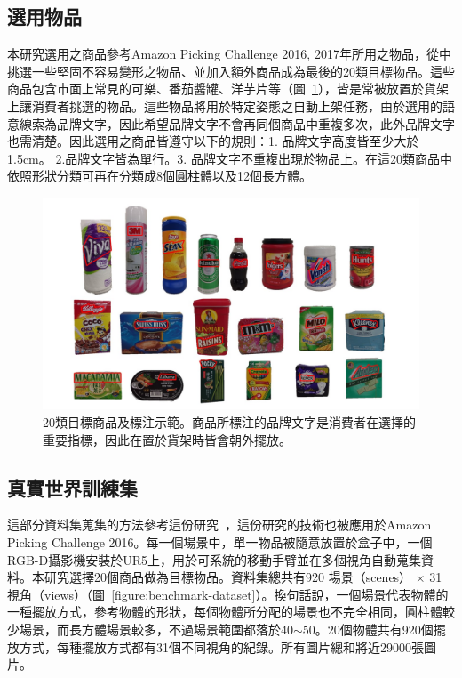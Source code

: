 \subsection{選用物品}
本研究選用之商品參考Amazon Picking Challenge 2016, 2017年所用之物品，從中挑選一些堅固不容易變形之物品、並加入額外商品成為最後的20類目標物品。這些商品包含市面上常見的可樂、番茄醬罐、洋芋片等（圖~\ref{figure:20_products}），皆是常被放置於貨架上讓消費者挑選的物品。這些物品將用於特定姿態之自動上架任務，由於選用的語意線索為品牌文字，因此希望品牌文字不會再同個商品中重複多次，此外品牌文字也需清楚。因此選用之商品皆遵守以下的規則：1. 品牌文字高度皆至少大於1.5cm。 2.品牌文字皆為單行。3. 品牌文字不重複出現於物品上。在這20類商品中依照形狀分類可再在分類成8個圓柱體以及12個長方體。


\begin{figure}[H]
	\centering
	\includegraphics[height=!, width=1.0\linewidth, keepaspectratio=true]
	{./figures/20_products.jpg}
  \caption{20類目標商品及標注示範。商品所標注的品牌文字是消費者在選擇的重要指標，因此在置於貨架時皆會朝外擺放。}
  \label{figure:20_products}
\end{figure}


\subsection{真實世界訓練集}
這部分資料集蒐集的方法參考這份研究~\cite{zeng2016multi}，這份研究的技術也被應用於Amazon Picking Challenge 2016。每一個場景中，單一物品被隨意放置於盒子中，一個RGB-D攝影機安裝於UR5上，用於可系統的移動手臂並在多個視角自動蒐集資料。本研究選擇20個商品做為目標物品。資料集總共有920 場景（scenes） $\times$ 31 視角（views）（圖~\ref{figure:benchmark-dataset}）。換句話說，一個場景代表物體的一種擺放方式，參考物體的形狀，每個物體所分配的場景也不完全相同，圓柱體較少場景，而長方體場景較多，不過場景範圍都落於40$\sim$50。20個物體共有920個擺放方式，每種擺放方式都有31個不同視角的紀錄。所有圖片總和將近29000張圖片。


